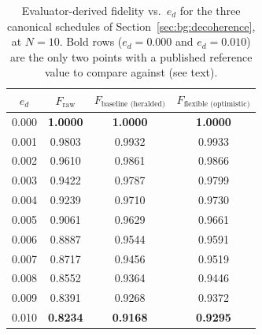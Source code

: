\begin{table}[ht]
    \centering\small
    \begin{tabular}{cccc}
        \hline
        $e_d$ & $F_{\text{raw}}$ & $F_{\text{baseline (heralded)}}$ & $F_{\text{flexible (optimistic)}}$ \\
        \hline
        0.000 & \textbf{1.0000} & \textbf{1.0000} & \textbf{1.0000} \\
        0.001 & 0.9803 & 0.9932 & 0.9933 \\
        0.002 & 0.9610 & 0.9861 & 0.9866 \\
        0.003 & 0.9422 & 0.9787 & 0.9799 \\
        0.004 & 0.9239 & 0.9710 & 0.9730 \\
        0.005 & 0.9061 & 0.9629 & 0.9661 \\
        0.006 & 0.8887 & 0.9544 & 0.9591 \\
        0.007 & 0.8717 & 0.9456 & 0.9519 \\
        0.008 & 0.8552 & 0.9364 & 0.9446 \\
        0.009 & 0.8391 & 0.9268 & 0.9372 \\
        0.010 & \textbf{0.8234} & \textbf{0.9168} & \textbf{0.9295} \\
        \hline
    \end{tabular}

    \caption[Evaluator-derived fidelity vs.\ $e_d$ (validation table)]{Evaluator-derived fidelity vs.\ $e_d$ for the three canonical schedules of Section~\ref{sec:bg:decoherence}, at $N=10$. Bold rows ($e_d=0.000$ and $e_d=0.010$) are the only two points with a published reference value to compare against (see text).}
    \label{tab:app:validation}
\end{table}